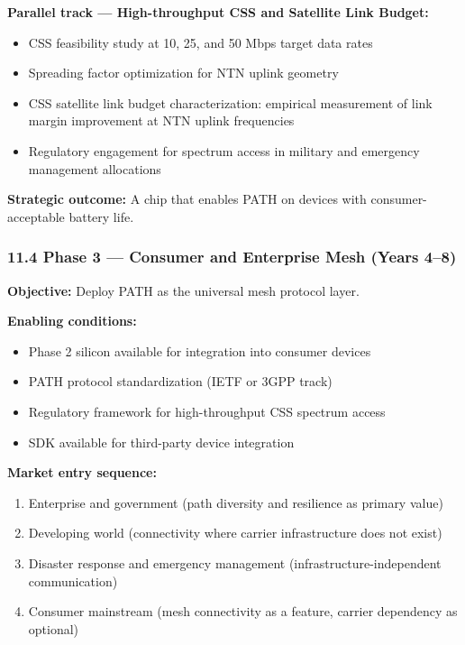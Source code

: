 \documentclass[
  11pt,
]{article}
\providecommand{\tightlist}{%
  \setlength{\itemsep}{0pt}\setlength{\parskip}{0pt}}
\begin{document}
\textbf{Parallel track --- High-throughput CSS and Satellite Link
Budget:}

\begin{itemize}
\tightlist
\item
  CSS feasibility study at 10, 25, and 50 Mbps target data rates
\item
  Spreading factor optimization for NTN uplink geometry
\item
  CSS satellite link budget characterization: empirical measurement of
  link margin improvement at NTN uplink frequencies
\item
  Regulatory engagement for spectrum access in military and emergency
  management allocations
\end{itemize}

\textbf{Strategic outcome:} A chip that enables PATH on devices with
consumer-acceptable battery life.

\hypertarget{phase-3-consumer-and-enterprise-mesh-years-48}{%
\subsubsection{11.4 Phase 3 --- Consumer and Enterprise Mesh (Years
4--8)}\label{phase-3-consumer-and-enterprise-mesh-years-48}}

\textbf{Objective:} Deploy PATH as the universal mesh protocol layer.

\textbf{Enabling conditions:}

\begin{itemize}
\tightlist
\item
  Phase 2 silicon available for integration into consumer devices
\item
  PATH protocol standardization (IETF or 3GPP track)
\item
  Regulatory framework for high-throughput CSS spectrum access
\item
  SDK available for third-party device integration
\end{itemize}

\textbf{Market entry sequence:}

\begin{enumerate}
\def\labelenumi{\arabic{enumi}.}
\tightlist
\item
  Enterprise and government (path diversity and resilience as primary
  value)
\item
  Developing world (connectivity where carrier infrastructure does not
  exist)
\item
  Disaster response and emergency management (infrastructure-independent
  communication)
\item
  Consumer mainstream (mesh connectivity as a feature, carrier
  dependency as optional)
\end{enumerate}
\end{document}
